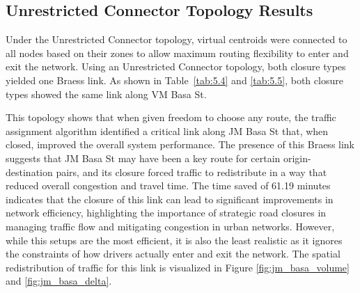\subsection{Unrestricted Connector Topology Results}
\label{sec:unrestricted_results}

\begin{table}[H]
    \centering
    \renewcommand{\thetable}{4.4}
    \caption{Bidirectional Unrestricted Connector Setup Results}
    \label{tab:5.4}
\end{table}

\begin{table}[H]
    \centering
    \renewcommand{\thetable}{4.5}
    \caption{Unidirectional Unrestricted Connector Setup Results}
    \label{tab:5.5}
\end{table}

Under the Unrestricted Connector topology, virtual centroids were connected to all nodes based on their zones to allow maximum routing flexibility to enter and exit the network. Using an Unrestricted Connector topology, both closure types yielded one Braess link. As shown in Table~\ref{tab:5.4} and \ref{tab:5.5}, both closure types showed the same link along VM Basa St. 



This topology shows that when given freedom to choose any route, the traffic assignment algorithm identified a critical link along JM Basa St that, when closed, improved the overall system performance. The presence of this Braess link suggests that JM Basa St may have been a key route for certain origin-destination pairs, and its closure forced traffic to redistribute in a way that reduced overall congestion and travel time. The time saved of 61.19 minutes indicates that the closure of this link can lead to significant improvements in network efficiency, highlighting the importance of strategic road closures in managing traffic flow and mitigating congestion in urban networks. However, while this setups are the most efficient, it is also the least realistic as it ignores the constraints of how drivers actually enter and exit the network. The spatial redistribution of traffic for this link is visualized in Figure \ref{fig:jm_basa_volume} and \ref{fig:jm_basa_delta}.

